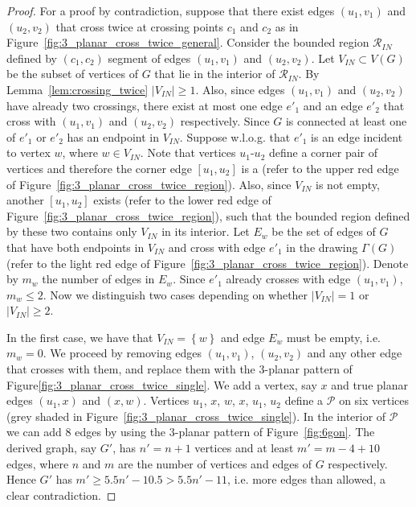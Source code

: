 \begin{proof}
For a proof by contradiction, suppose that there exist edges $(u_1,v_1)$ and $(u_2,v_2)$ that cross twice at crossing points $c_1$ and $c_2$ as in Figure~\ref{fig:3_planar_cross_twice_general}. Consider the bounded region $\mathcal{R}_{IN}$ defined by $(c_1,c_2)$ segment of edges $(u_1,v_1)$ and $(u_2,v_2)$. Let $V_{IN}\subset V(G)$ be the subset of vertices of $G$ that lie in the interior of $\mathcal{R}_{IN}$. By Lemma~\ref{lem:crossing_twice} $|V_{IN}|\geq 1$. Also, since edges $(u_1,v_1)$ and $(u_2,v_2)$ have already two crossings, there exist at most one edge $e'_1$ and an edge $e'_2$ that cross with $(u_1,v_1)$ and $(u_2,v_2)$ respectively. Since $G$ is connected  at least one of $e'_1$ or $e'_2$ has an endpoint in $V_{IN}$. Suppose w.l.o.g. that $e'_1$ is an edge incident to vertex $w$, where $w\in V_{IN}$. Note that vertices $u_1$-$u_2$ define a corner pair of vertices and therefore the corner edge $[u_1,u_2]$ is a \pe (refer to the upper red edge of Figure~\ref{fig:3_planar_cross_twice_region}). Also, since $V_{IN}$ is not empty, another \pe $[u_1,u_2]$ exists (refer to the lower red edge of Figure~\ref{fig:3_planar_cross_twice_region}), such that the bounded region defined by these two \pes contains only $V_{IN}$ in its interior. Let $E_w$ be the set of edges of $G$ that have both endpoints in $V_{IN}$ and cross with edge $e'_1$ in the drawing $\Gamma(G)$ (refer to the light red edge of Figure~\ref{fig:3_planar_cross_twice_region}). Denote by $m_w$ the number of edges in $E_w$. Since $e'_1$ already crosses with edge $(u_1,v_1)$, $m_w\leq 2$. Now we distinguish two cases depending on whether $|V_{IN}|=1$ or $|V_{IN}|\geq 2$.

In the first case, we have that $V_{IN}=\left\{w\right\}$ and edge $E_w$ must be empty, i.e. $m_w=0$. We proceed by removing edges $(u_1,v_1)$, $(u_2,v_2)$ and any other edge that crosses with them, and replace them with the $3$-planar pattern of Figure\ref{fig:3_planar_cross_twice_single}. We add a vertex, say $x$ and true planar edges $(u_1,x)$ and $(x,w)$. Vertices $u_1$, $x$, $w$, $x$, $u_1$, $u_2$ define a \pp $\mathcal{P}$ on six vertices (grey shaded in Figure~\ref{fig:3_planar_cross_twice_single}). In the interior of $\mathcal{P}$ we can add $8$ edges by using the $3$-planar pattern of Figure~\ref{fig:6gon}. The derived graph, say $G'$, has $n'=n+1$ vertices and at least $m'=m-4+10$ edges, where $n$ and $m$ are the number of vertices and edges of $G$ respectively. Hence $G'$ has $m'\geq 5.5n'-10.5>5.5n'-11$, i.e. more edges than allowed, a clear contradiction.


\end{proof}
